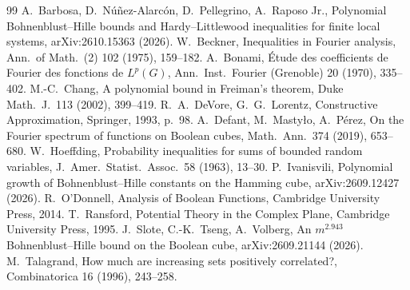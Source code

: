 \documentclass[11pt]{amsart}
\theoremstyle{definition}
\begin{document}
\begin{thebibliography}{99}
 A.~Barbosa, D.~N\'u\~nez-Alarc\'on, D.~Pellegrino, A.~Raposo Jr., Polynomial Bohnenblust--Hille bounds and Hardy--Littlewood inequalities for finite local systems, arXiv:2610.15363 (2026).
 W.~Beckner, Inequalities in Fourier analysis, Ann.\ of Math.\ (2) 102 (1975), 159--182.
 A.~Bonami, \'Etude des coefficients de Fourier des fonctions de $L^p(G)$, Ann.\ Inst.\ Fourier (Grenoble) 20 (1970), 335--402.
 M.-C.~Chang, A polynomial bound in Freiman's theorem, Duke Math.\ J.\ 113 (2002), 399--419.
 R.~A.~DeVore, G.~G.~Lorentz, Constructive Approximation, Springer, 1993, p.~98.
 A.~Defant, M.~Mastyło, A.~P\'erez, On the Fourier spectrum of functions on Boolean cubes, Math.\ Ann.\ 374 (2019), 653--680.
 W.~Hoeffding, Probability inequalities for sums of bounded random variables, J.\ Amer.\ Statist.\ Assoc.\ 58 (1963), 13--30.
 P.~Ivanisvili, Polynomial growth of Bohnenblust--Hille constants on the Hamming cube, arXiv:2609.12427 (2026).
 R.~O'Donnell, Analysis of Boolean Functions, Cambridge University Press, 2014.
 T.~Ransford, Potential Theory in the Complex Plane, Cambridge University Press, 1995.
 J.~Slote, C.-K.~Tseng, A.~Volberg, An $m^{2.943}$ Bohnenblust--Hille bound on the Boolean cube, arXiv:2609.21144 (2026).
 M.~Talagrand, How much are increasing sets positively correlated?, Combinatorica 16 (1996), 243--258.
\end{thebibliography}
\end{document}
